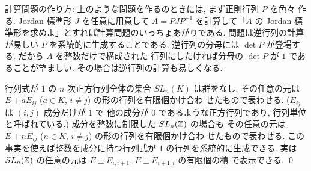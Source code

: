 \documentclass[12pt,twoside]{jarticle}
\begin{document}

% 
% 
% 
% 
% 

% 
% 
% 
% 
% 

% 
% 
% 
% 
% 

% 
% 
% 
% 
% 

% 
% 
% 
% 
% 

% 
% 
% 
% 
% 

\medskip
\noindent
計算問題の作り方: 上のような問題を作るのときには, まず正則行列 $P$ を色々
作る.  Jordan 標準形 $J$ を任意に用意して $A=PJP^{-1}$ を計算して「$A$ の 
Jordan 標準形を求めよ」とすれば計算問題のいっちょあがりである. 
問題は逆行列の計算が易しい $P$ を系統的に生成することである.  
逆行列の分母には $\det P$ が登場する.  だから $A$ を整数だけで構成された
行列にしたければ分母の $\det P$ が $1$ であることが望ましい.  
その場合は逆行列の計算も易しくなる.  

行列式が $1$ の $n$ 次正方行列全体の集合 $SL_n(K)$ は群をなし, 
その任意の元は $E+a E_{ij}$ ($a\in K$, $i\ne j$) の形の行列を有限個かけ合わ
せたもので表わせる.  ($E_{ij}$ は $(i,j)$ 成分だけが $1$ で
他の成分が $0$ であるような正方行列であり, 行列単位と呼ばれている.)
成分を整数に制限した $SL_n({\mathbb Z})$ の場合も
その任意の元は $E+n E_{ij}$ ($n\in K$, $i\ne j$) の形の行列を有限個かけ合わ
せたもので表わせる.  
この事実を使えば整数を成分に持つ行列式が $1$ の行列を系統的に生成できる.
実は $SL_n({\mathbb Z})$ の任意の元は $E\pm E_{i,i+1}$, $E\pm E_{i+1,i}$ の有限個の積
で表示できる. 
\qed
\end{document}

